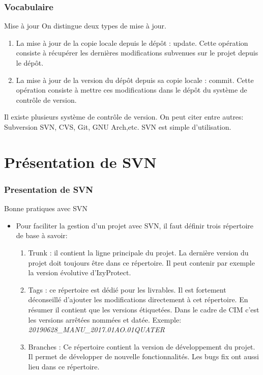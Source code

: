 \documentclass{beamer}
\begin{document}
\begin{frame}
\frametitle{Vocabulaire}
\begin{block}{Mise à jour}
On distingue deux types de mise à jour.
\begin{enumerate}
\item La mise à jour de la copie locale depuis le dépôt :  \alert{update}. Cette opération consiste à récupérer les dernières modifications subvenues sur le projet depuis le dépôt. 
 \item La mise à jour de la version du dépôt depuis sa copie locale :  \alert{commit}. Cette opération consiste à mettre ces modifications dans le dépôt du système de contrôle de version.
\end{enumerate}
\end{block}
\end{frame}
\begin{frame}
Il existe plusieurs système de contrôle de version. On peut citer entre autres: \alert{Subversion SVN}, CVS, Git, GNU Arch,etc. \alert{SVN} est simple d'utilisation. 
\end{frame}

\section{Présentation de SVN}
\begin{frame}
\frametitle{Presentation de SVN}
\begin{block}{Bonne pratiques avec SVN}
\begin{itemize}
\item Pour faciliter la gestion d'un projet avec SVN, il faut définir trois répertoire de base à savoir:
\begin{enumerate}
\item \alert{Trunk : } il contient la ligne principale du projet. La dernière version du projet doit toujours être dans ce répertoire. Il peut contenir par exemple la version évolutive d'IzyProtect.
\item \alert{Tags : } ce répertoire est dédié pour les livrables. Il est fortement déconseillé d'ajouter les modifications directement à cet répertoire. En résumer il contient que \alert{les versions étiquetées}. Dans le cadre de CIM c'est les versions arrêtées nommées et datée. Exemple: \alert{\textit{20190628\_MANU\_2017.01AO.01QUATER}} 
\item \alert{Branches : } Ce répertoire contient la version de développement du projet. Il permet de développer de nouvelle fonctionnalités. Les bugs fix  ont aussi lieu dans ce répertoire. 
\end{enumerate}
\end{itemize}

\end{block}
\end{frame}
\end{document}
